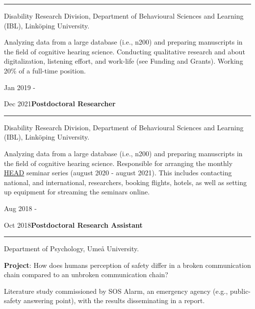\documentclass[]{article}
\begin{document}
\hrule
\begin{changemargin}{2.3cm}{2.4cm}

Disability Research Division, Department of Behavioural Sciences and Learning (IBL), Linköping University.

Analyzing data from a large database (i.e., n200) and preparing manuscripts in the field of cognitive hearing science. Conducting qualitative research and about digitalization, listening effort, and work-life (see Funding and Grants). Working 20\% of a full-time position.

\end{changemargin}

Jan 2019 -

Dec 2021\hspace{0.78cm}\textbf{Postdoctoral Researcher}\vspace{1mm}

\hrule
\begin{changemargin}{2.3cm}{2.4cm}

Disability Research Division, Department of Behavioural Sciences and Learning (IBL), Linköping University.

Analyzing data from a large database (i.e., n200) and preparing manuscripts in the field of cognitive hearing science. Responsible for arranging the monthly \href{https://liu.se/linnecentrum-head/en}{HEAD} seminar series (august 2020 - august 2021). This includes contacting national, and international, researchers, booking flights, hotels, as well as setting up equipment for streaming the seminars online.

\end{changemargin}

Aug 2018 -

Oct
2018\hspace{0.75cm}\textbf{Postdoctoral Research Assistant}\vspace{1mm}

\hrule
\begin{changemargin}{2.3cm}{2.4cm}

Department of Psychology, Umeå University.

\textbf{Project}: How does humans perception of safety differ in a broken communication chain compared to an unbroken communication chain? 

Literature study commissioned by SOS Alarm, an emergency agency (e.g., public-safety answering point), with the results disseminating in a report.

\end{changemargin}
\end{document}
